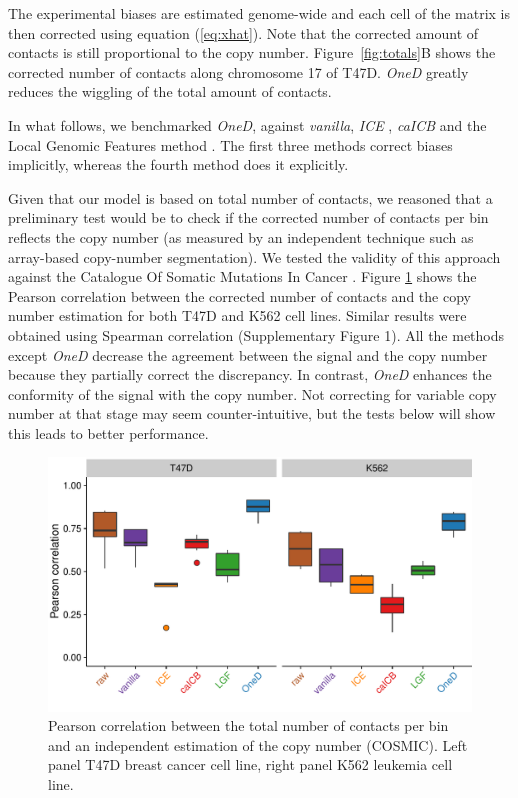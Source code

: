 \documentclass{bioinfo}
\begin{document}
The experimental biases are estimated genome-wide and each cell of the
matrix is then corrected using equation (\ref{eq:xhat}). Note that the
corrected amount of contacts is still proportional to the copy number.
Figure~\ref{fig:totals}B shows the corrected number of contacts along
chromosome 17 of T47D. \textit{OneD} greatly reduces the wiggling of the
total amount of contacts.


In what follows, we benchmarked \textit{OneD},
against \textit{vanilla}, \textit{ICE} \citep{imakaev2012iterative}, \textit{caICB} \citep{wu2016computational}
and the Local Genomic Features method \citep[\textit{LGF},][]{hu2012hicnorm,
servant2012hitc}. The first three methods correct biases implicitly, whereas the
fourth method does it explicitly.

Given that our model is based on total number of contacts, we reasoned that a preliminary test
would be to check if the corrected number of contacts per bin reflects the copy
number (as measured by an independent technique such as array-based copy-number
segmentation). We tested the validity of this approach against the Catalogue Of Somatic
Mutations In Cancer \citep[COSMIC,][]{forbes2010cosmic}. Figure \ref{fig:copy_number} shows the Pearson correlation
between the corrected number of contacts and the copy number estimation
for both T47D and K562 cell lines. Similar results were obtained using
Spearman correlation (Supplementary Figure 1). All the methods except
\textit{OneD} decrease the agreement between the signal and the copy
number because they partially correct the discrepancy. In contrast,
\textit{OneD} enhances the conformity of the signal with the copy number.
Not correcting for variable copy number at that stage may seem
counter-intuitive, but the tests below will show this leads to better
performance.


\begin{figure}[b]
	\centerline{\includegraphics[width=.45\textwidth]
{img/copy_number_figure2.pdf}}
\caption{Pearson correlation between the total number of contacts per bin
and an independent estimation of the copy number (COSMIC). Left panel
T47D breast cancer cell line, right panel K562 leukemia cell line.}
\label{fig:copy_number}
\end{figure}
\end{document}
